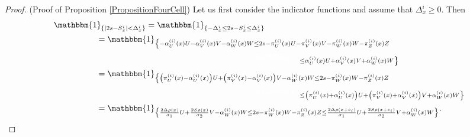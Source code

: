 \documentclass[12pt]{article}
\theoremstyle{Theorem}
\begin{document}
\begin{proof}(Proof of Proposition \ref{PropositionFourCell})
Let us first consider the indicator functions and assume that $\Delta^{i}_{\scriptscriptstyle x} \geq 0$. Then 
{\small
\begin{align*}
\mathbbm{1}_{\left\{ |2s - S^{i}_{\scriptscriptstyle x}| < \Delta^{i}_ {\scriptscriptstyle x}\right\}} & =  \mathbbm{1}_{\left\{- \Delta^{i}_ {\scriptscriptstyle x} \leq 2s - S^{i}_ {\scriptscriptstyle x} \leq \Delta^{i}_ {\scriptscriptstyle x}\right\}} \\
& \hspace{-2.1cm} = \mathbbm{1}_{\left\{ -  \alpha^{\scriptscriptstyle(i)}_{U}(x)U -  \alpha^{\scriptscriptstyle(i)}_{V}(x) V -  \alpha^{\scriptscriptstyle(i)}_{W}(x) W \leq 2s -  \pi^{\scriptscriptstyle(i)}_{U}(x)U -  \pi^{\scriptscriptstyle(i)}_{V}(x) V -  \pi^{\scriptscriptstyle(i)}_{W}(x) W -  \pi^{\scriptscriptstyle(i)}_{Z}(x)Z \right.} \\
& \phantom{=} \hspace{4.2cm} \textcolor{white}{\mathbbm{1}}_{\left.\leq   \alpha^{\scriptscriptstyle(i)}_{U}(x)U +  \alpha^{\scriptscriptstyle(i)}_{V}(x) V +  \alpha^{\scriptscriptstyle(i)}_{W}(x) W \right\}} \\
&\hspace{-2.1cm} = \mathbbm{1}_{\left\{ \left( \pi^{\scriptscriptstyle(i)}_{U}(x) -  \alpha^{\scriptscriptstyle(i)}_{U}(x)\right) U + \left( \pi^{\scriptscriptstyle(i)}_{V}(x) -  \alpha^{\scriptscriptstyle(i)}_{V}(x) \right) V -  \alpha^{\scriptscriptstyle(i)}_{W}(x) W \leq 2s -  \pi^{\scriptscriptstyle(i)}_{W}(x) W -  \pi^{\scriptscriptstyle(i)}_{Z}(x)Z \right.} \\
& \phantom{=} \hspace{4.2cm}\textcolor{white}{\mathbbm{1}}_{\left.\leq \left( \pi^{\scriptscriptstyle(i)}_{U}(x) + \alpha^{\scriptscriptstyle(i)}_{U}(x)\right) U + \left( \pi^{\scriptscriptstyle(i)}_{V}(x) +  \alpha^{\scriptscriptstyle(i)}_{V}(x) \right) V +  \alpha^{\scriptscriptstyle(i)}_{W}(x) W \right\}} \\ 
& \hspace{-2.1cm} = \mathbbm{1}_{\left\{\frac{2\Delta \rho(x)}{\sigma_1} U + \frac{2S \rho(x)}{\sigma_{2}}V - \alpha^{\scriptscriptstyle(i)}_{W}(x) W \leq 2s -  \pi^{\scriptscriptstyle(i)}_{W}(x) W -  \pi^{\scriptscriptstyle(i)}_{Z}(x)Z \leq \frac{2\Delta \rho(x+e_i) }{\sigma_1}U + \frac{2S \rho(x+e_i)}{\sigma_{2}}V +  \alpha^{\scriptscriptstyle(i)}_{W}(x) W\right\}}.
\end{align*}}

\end{proof}
\end{document}
